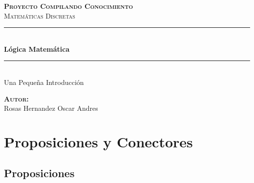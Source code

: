 \documentclass[12pt]{report}                                    %
\author{Oscar Andrés Rosas}                                     %
\begin{document}
\begin{titlepage}

	\center
	\textbf{\textsc{\Large Proyecto Compilando Conocimiento}}\\[1.0cm] 
	\textsc{\Large Matemáticas Discretas}\\[1.0cm] 

	\rule{\linewidth}{0.5mm} \\[1.0cm]
		{ \huge \bfseries Lógica Matemática}\\[1.0cm] 
	\rule{\linewidth}{0.5mm} \\[2.0cm]
	
	{\LARGE Una Pequeña Introducción}\\[7cm] 
	
	\begin{center} \large
	\textbf{\textsc{Autor:}}\\
	Rosas Hernandez Oscar Andres
	\end{center}

	\vfill

\end{titlepage}

\tableofcontents{}
\label{sec:Index}

\clearpage










\chapter{Proposiciones y Conectores}
    \clearpage

    \section{Proposiciones}
\end{document}

